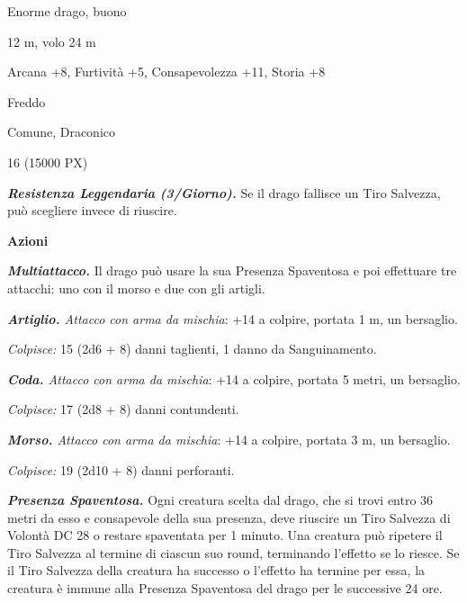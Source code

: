\begin{multicols}{2}
{
\begin{description}[noitemsep, topsep=0pt, parsep=0pt, partopsep=0pt, itemsep=1pt, leftmargin=2.35cm,  labelwidth=2.2cm, itemindent=0cm, listparindent=0pt] %
\setlength{\baselineskip}{10pt}
\item[\textbf{Taglia/Tipo}] Enorme drago, buono
\item[\textbf{Caratt.}] 
\item[\textbf{Punti Ferita}] 
\item[\textbf{Movimento}] 12 m, volo 24 m
\item[\textbf{Tiri Salvez.}] 
\item[\textbf{Comp.}] Arcana +8, Furtività +5, Consapevolezza +11, Storia +8
\item[\textbf{Imm. Danni}] Freddo
\item[\textbf{Sensi}] 
\item[\textbf{Linguaggi}] Comune, Draconico
\item[\textbf{Sfida}] 16 (15000 PX)
\end{description}
\smallskip

\emph{\textbf{Resistenza Leggendaria (3/Giorno).}} Se il drago fallisce un Tiro Salvezza, può scegliere invece di riuscire.

\textbf{Azioni}

\emph{\textbf{Multiattacco.}} Il drago può usare la sua Presenza Spaventosa e poi effettuare tre attacchi: uno con il morso e due con gli artigli.

\emph{\textbf{Artiglio.} Attacco con arma da mischia}: +14 a colpire, portata 1 m, un bersaglio.

\emph{Colpisce:} 15 (2d6 + 8) danni taglienti, 1 danno da Sanguinamento.

\emph{\textbf{Coda.} Attacco con arma da mischia}: +14 a colpire, portata 5 metri, un bersaglio.

\emph{Colpisce:} 17 (2d8 + 8) danni contundenti.

\emph{\textbf{Morso.} Attacco con arma da mischia}: +14 a colpire, portata 3 m, un bersaglio.

\emph{Colpisce:} 19 (2d10 + 8) danni perforanti.

\emph{\textbf{Presenza Spaventosa.}} Ogni creatura scelta dal drago, che si trovi entro 36 metri da esso e consapevole della sua presenza, deve riuscire un Tiro Salvezza di Volontà DC 28 o restare spaventata per 1 minuto. Una creatura può ripetere il Tiro Salvezza al termine di ciascun suo round, terminando l'effetto se lo riesce. Se il Tiro Salvezza della creatura ha successo o l'effetto ha termine per essa, la creatura è immune alla Presenza Spaventosa del drago per le successive 24 ore.

}
\end{multicols}
